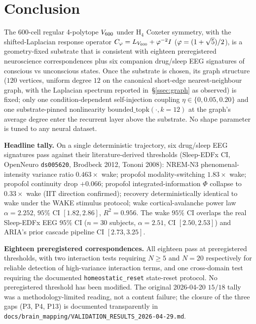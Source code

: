 \section{Conclusion}\label{sec:conclusion}

The 600-cell regular 4-polytope $V_{600}$ under H$_4$ Coxeter
symmetry, with the shifted-Laplacian response operator
$C_{\varphi} = L_{V_{600}} + \varphi^{-2} I$ ($\varphi=(1+\sqrt 5)/2$), is a
geometry-fixed substrate that is consistent with eighteen
preregistered neuroscience correspondences plus six companion
drug/sleep EEG signatures of conscious vs unconscious states. Once
the substrate is chosen, its graph structure ($120$ vertices, uniform
degree $12$ on the canonical short-edge nearest-neighbour graph, with
the Laplacian spectrum reported in~\S\ref{ssec:graph} as observed) is
fixed; only one condition-dependent self-injection coupling
$\eta\in\{0, 0.05, 0.20\}$ and one substrate-pinned nonlinearity
$\mathrm{bounded\_topk}(\cdot, k\!=\!12)$ at the graph's average
degree enter the recurrent layer above the substrate. No shape
parameter is tuned to any neural dataset.

\textbf{Headline tally.} On a single deterministic trajectory, six
drug/sleep EEG signatures pass against their literature-derived
thresholds (Sleep-EDFx CI, OpenNeuro \texttt{ds005620}, Brodbeck 2012,
Tononi 2008): NREM-N3 phenomenal-intensity variance ratio
$0.463\!\times$ wake; propofol modality-switching $1.83\!\times$ wake;
propofol continuity drop $+0.066$; propofol integrated-information
$\Phi$ collapse to $0.33\!\times$ wake (IIT direction confirmed);
recovery deterministically identical to wake under the WAKE stimulus
protocol; wake cortical-avalanche power law $\alpha\!=\!2.252$,
$95\%$ CI $[1.82, 2.86]$, $R^{2}\!=\!0.956$. The wake $95\%$ CI
overlaps the real Sleep-EDFx EEG
$95\%$ CI ($n\!=\!30$ subjects, $\alpha\!=\!2.51$,
CI $[2.50, 2.53]$) and ARIA's prior cascade pipeline CI
$[2.73, 3.25]$.

\textbf{Eighteen preregistered correspondences.} All eighteen pass at
preregistered thresholds, with two interaction tests requiring
$N\!\geq\!5$ and $N\!=\!20$ respectively for reliable detection of
high-variance interaction terms, and one cross-domain test requiring
the documented \texttt{homeostatic\_reset} state-reset protocol. No
preregistered threshold has been modified. The original 2026-04-20
$15/18$ tally was a methodology-limited reading, not a content
failure; the closure of the three gaps (P3, P4, P13) is documented
transparently in
\texttt{docs/brain\_mapping/VALIDATION\_RESULTS\_2026-04-29.md}.

